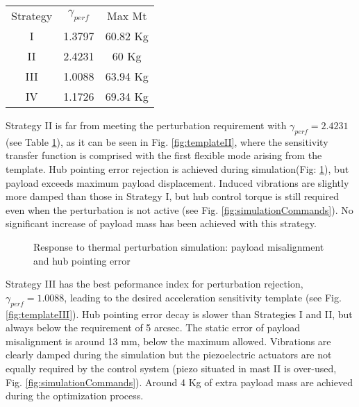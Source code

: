 \documentclass{ifacconf}
\begin{document}
\begin{table}
\caption{}
\begin{center}
\label{tab:results}
\begin{tabular}{c c c}
& & \\ \hline
\hline
Strategy & $\gamma_{perf}$ & Max Mt \\
\hline
I & 1.3797 &  60.82 Kg\\
II & 2.4231 & 60 Kg\\
III & 1.0088 & 63.94 Kg \\
IV & 1.1726 & 69.34 Kg \\
\hline
\hline
\end{tabular}
\end{center}
\end{table}

Strategy II is far from meeting the perturbation requirement with $\gamma_{perf} = 2.4231$ (see Table \ref{tab:results}), as it can be seen in Fig. \ref{fig:templateII}, where the sensitivity transfer function is comprised with the first flexible mode arising from the template. Hub pointing error rejection is achieved during simulation(Fig: \ref{fig:simulationPointing}), but payload exceeds maximum payload displacement. Induced vibrations are slightly more damped than those in Strategy I, but hub control torque is still required even when the perturbation is not active (see Fig. \ref{fig:simulationCommands}). No significant increase of payload mass has been achieved with this strategy.

\begin{figure}[]
\centering
{}
\hfill
{}
\caption{Response to thermal perturbation simulation: payload misalignment and hub pointing error}
\label{fig:simulationPointing}
\end{figure}

Strategy III has the best peformance index for perturbation rejection, $\gamma_{perf} = 1.0088$, leading to the desired acceleration sensitivity template (see Fig. \ref{fig:templateIII}). Hub pointing error decay is slower than Strategies I and II, but always below the requirement of 5 arcsec. The static error of payload misalignment is  around 13 mm, below the maximum allowed. Vibrations are clearly damped during the simulation but the piezoelectric actuators are not equally required by the control system (piezo situated in mast II is over-used, Fig. \ref{fig:simulationCommands}). Around 4 Kg of extra payload mass are achieved during the optimization process. 
\end{document}
